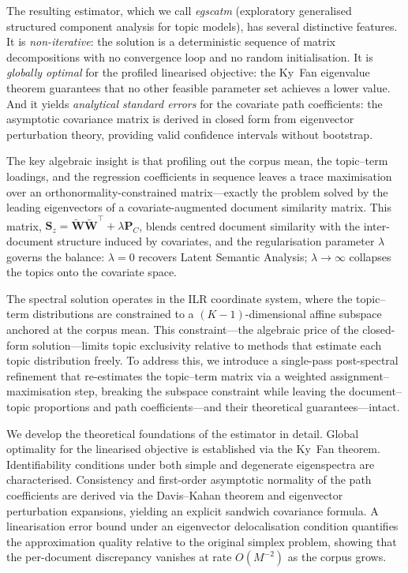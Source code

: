 The resulting estimator, which we call \emph{egscatm} (exploratory
generalised structured component analysis for topic models), has
several distinctive features.
It is \emph{non-iterative}: the solution is a deterministic sequence
of matrix decompositions with no convergence loop and no random
initialisation.
It is \emph{globally optimal} for the profiled linearised objective:
the Ky~Fan eigenvalue theorem guarantees that no other feasible
parameter set achieves a lower value.
And it yields \emph{analytical standard errors} for the covariate
path coefficients: the asymptotic covariance matrix is derived in
closed form from eigenvector perturbation theory, providing valid
confidence intervals without bootstrap.
 
The key algebraic insight is that profiling out the corpus mean,
the topic--term loadings, and the regression coefficients in
sequence leaves a trace maximisation over an orthonormality-constrained
matrix---exactly the problem solved by the leading eigenvectors of a
covariate-augmented document similarity matrix. This matrix,
$\mathbf{S}_z = \widetilde{\mathbf{W}}\widetilde{\mathbf{W}}^{\!\top}
+ \lambda\mathbf{P}_C$, blends centred document similarity with the
inter-document structure induced by covariates, and the regularisation
parameter $\lambda$ governs the balance: $\lambda=0$ recovers Latent
Semantic Analysis; $\lambda\to\infty$ collapses the topics onto the
covariate space.
 
The spectral solution operates in the ILR coordinate system, where
the topic--term distributions are constrained to a
$(K{-}1)$-dimensional affine subspace anchored at the corpus mean.
This constraint---the algebraic price of the closed-form
solution---limits topic exclusivity relative to methods that
estimate each topic distribution freely.
To address this, we introduce a single-pass post-spectral refinement
that re-estimates the topic--term matrix via a weighted
assignment--maximisation step, breaking the subspace constraint while
leaving the document--topic proportions and path coefficients---and
their theoretical guarantees---intact.
 
We develop the theoretical foundations of the estimator in detail.
Global optimality for the linearised objective is established via the
Ky~Fan theorem. Identifiability conditions under both simple and
degenerate eigenspectra are characterised.
Consistency and first-order asymptotic normality of the path
coefficients are derived via the Davis--Kahan theorem and eigenvector
perturbation expansions, yielding an explicit sandwich covariance
formula.
A linearisation error bound under an eigenvector delocalisation
condition quantifies the approximation quality relative to the
original simplex problem, showing that the per-document discrepancy
vanishes at rate $O(M^{-2})$ as the corpus grows.
 
